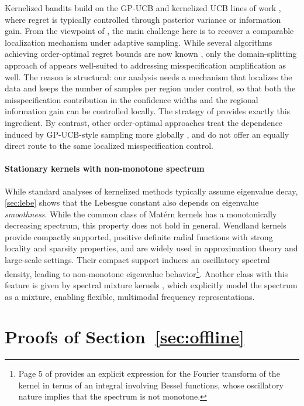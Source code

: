 \documentclass{article}
\let\cite\citep
\numberwithin{theorem}{section}
\theoremstyle{definition}
\begin{document}
Kernelized bandits build on the GP-UCB and kernelized UCB lines of work \cite{srinivas2010gaussian,chowdhury2017kernelized,valko2013finite}, where regret is typically controlled through posterior variance or information gain. From the viewpoint of \cite{maran2025beyond}, the main challenge here is to recover a comparable localization mechanism under adaptive sampling. While several algorithms achieving order-optimal regret bounds are now known \cite{salgia2021domain,camilleri2021high,li2022gaussian}, only the domain-splitting approach of \cite{janz2020bandit} appears well-suited to addressing misspecification amplification as well. The reason is structural: our analysis needs a mechanism that localizes the data and keeps the number of samples per region under control, so that both the misspecification contribution in the confidence widths and the regional information gain can be controlled locally. The strategy of \cite{janz2020bandit} provides exactly this ingredient. By contrast, other order-optimal approaches treat the dependence induced by GP-UCB-style sampling more globally \cite{whitehouse2023sublinear}, and do not offer an equally direct route to the same localized misspecification control.

\paragraph{Stationary kernels with non-monotone spectrum} While standard analyses of kernelized methods typically assume eigenvalue decay, \cref{sec:lebe} shows that the Lebesgue constant also depends on eigenvalue \textit{smoothness}. While the common class of Mat\'ern kernels has a monotonically decreasing spectrum, this property does not hold in general.
Wendland kernels \cite{wendland1995piecewise} provide compactly supported, positive definite radial functions with strong locality and sparsity properties, and are widely used in approximation theory and large-scale settings. Their compact support induces an oscillatory spectral density, leading to non-monotone eigenvalue behavior\footnote{Page 5 of \cite{wendland1995piecewise} provides an explicit expression for the Fourier transform of the kernel in terms of an integral involving Bessel functions, whose oscillatory nature implies that the spectrum is not monotone.}. Another class with this feature is given by spectral mixture kernels \cite{parra2017spectral}, which explicitly model the spectrum as a mixture, enabling flexible, multimodal frequency representations.


\section{Proofs of Section~\ref{sec:offline}}\label{sec:proofs1}
\end{document}
